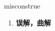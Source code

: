 
\begin{frame}
{\huge misconstrue}
\begin{center}
\begin{enumerate}\Large
  \item \textbf{误解，曲解}
\end{enumerate}
\end{center}
\end{frame}
